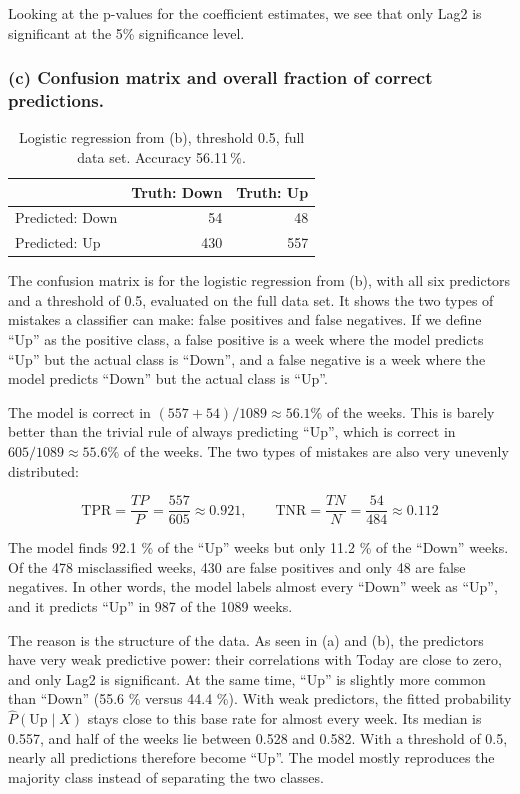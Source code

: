 \documentclass[11pt]{article}
\begin{document}
Looking at the p-values for the coefficient estimates, we see that only Lag2 is significant at the 5\% significance level.

\subsubsection*{(c) Confusion matrix and overall fraction of correct predictions.}

\begin{table}[H]
  \centering
  \begin{tabular}{lrr}
    \toprule
    & Truth: Down & Truth: Up \\
    \midrule
    Predicted: Down & 54 & 48 \\
    Predicted: Up & 430 & 557 \\
    \bottomrule
  \end{tabular}
  \caption{Logistic regression from (b), threshold 0.5, full data set. Accuracy 56.11\,\%.}
\end{table}

The confusion matrix is for the logistic regression from (b), with all six predictors and a threshold of 0.5, evaluated on the full data set. It shows the two types of mistakes a classifier can make: false positives and false negatives. If we define ``Up'' as the positive class, a false positive is a week where the model predicts ``Up'' but the actual class is ``Down'', and a false negative is a week where the model predicts ``Down'' but the actual class is ``Up''.

The model is correct in \((557 + 54)/1089 \approx 56.1\%\) of the weeks. This is barely better than the trivial rule of always predicting ``Up'', which is correct in \(605/1089 \approx 55.6\%\) of the weeks. The two types of mistakes are also very unevenly distributed:

\[\text{TPR} = \frac{TP}{P} = \frac{557}{605} \approx 0.921, \qquad \text{TNR} = \frac{TN}{N} = \frac{54}{484} \approx 0.112\]

The model finds 92.1 \% of the ``Up'' weeks but only 11.2 \% of the ``Down'' weeks. Of the 478 misclassified weeks, 430 are false positives and only 48 are false negatives. In other words, the model labels almost every ``Down'' week as ``Up'', and it predicts ``Up'' in 987 of the 1089 weeks.

The reason is the structure of the data. As seen in (a) and (b), the predictors have very weak predictive power: their correlations with Today are close to zero, and only Lag2 is significant. At the same time, ``Up'' is slightly more common than ``Down'' (55.6 \% versus 44.4 \%). With weak predictors, the fitted probability \(\hat P(\text{Up} \mid X)\) stays close to this base rate for almost every week. Its median is 0.557, and half of the weeks lie between 0.528 and 0.582. With a threshold of 0.5, nearly all predictions therefore become ``Up''. The model mostly reproduces the majority class instead of separating the two classes.
\end{document}
